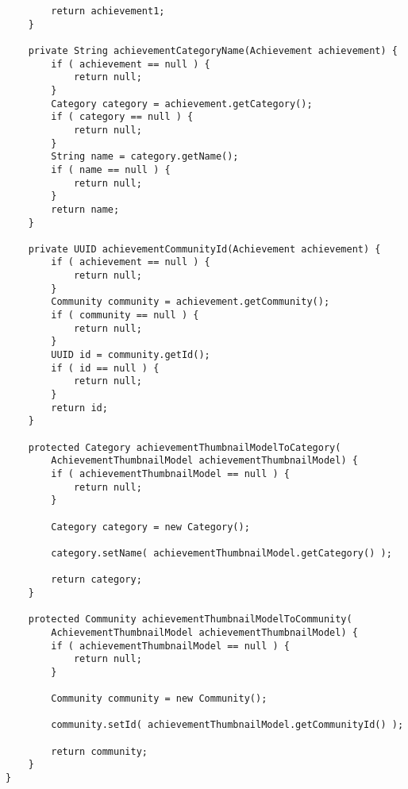 \begin {lstlisting}
        return achievement1;
    }

    private String achievementCategoryName(Achievement achievement) {
        if ( achievement == null ) {
            return null;
        }
        Category category = achievement.getCategory();
        if ( category == null ) {
            return null;
        }
        String name = category.getName();
        if ( name == null ) {
            return null;
        }
        return name;
    }

    private UUID achievementCommunityId(Achievement achievement) {
        if ( achievement == null ) {
            return null;
        }
        Community community = achievement.getCommunity();
        if ( community == null ) {
            return null;
        }
        UUID id = community.getId();
        if ( id == null ) {
            return null;
        }
        return id;
    }

    protected Category achievementThumbnailModelToCategory(
        AchievementThumbnailModel achievementThumbnailModel) {
        if ( achievementThumbnailModel == null ) {
            return null;
        }

        Category category = new Category();

        category.setName( achievementThumbnailModel.getCategory() );

        return category;
    }

    protected Community achievementThumbnailModelToCommunity(
        AchievementThumbnailModel achievementThumbnailModel) {
        if ( achievementThumbnailModel == null ) {
            return null;
        }

        Community community = new Community();

        community.setId( achievementThumbnailModel.getCommunityId() );

        return community;
    }
}

\end{lstlisting}
